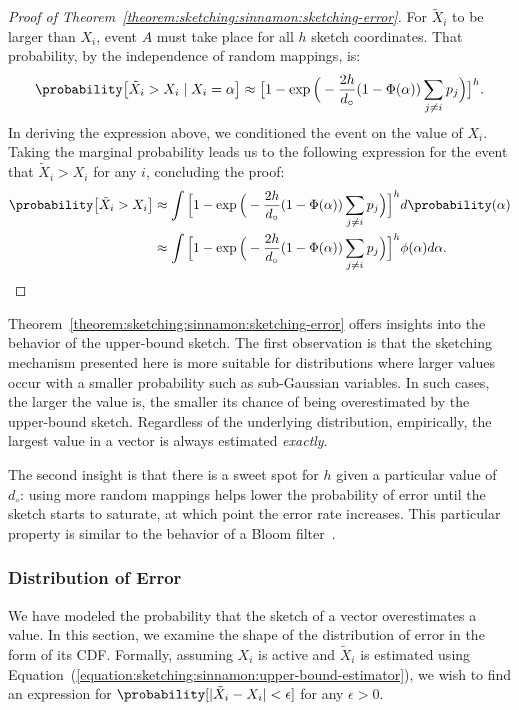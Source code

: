 \begin{proof}[Proof of Theorem~\ref{theorem:sketching:sinnamon:sketching-error}]
    For $\tilde{X}_i$ to be larger than $X_i$, event $A$ must take place for all $h$ sketch coordinates.
    That probability, by the independence of random mappings, is:
    \begin{equation*}
        \probability\big[ \tilde{X}_i > X_i \;|\; X_i = \alpha \big] \approx \big[ 1 - \exp\Big(-\frac{2h}{d_\circ} (1 - \Phi(\alpha)) \sum_{j \neq i} p_j \Big) \big]^h.
    \end{equation*}
    In deriving the expression above, we conditioned the event on the value of $X_i$.
    Taking the marginal probability leads us to the following expression for the event
    that $\tilde{X}_i > X_i$ for any $i$, concluding the proof:
    \begin{align*}
        \probability\big[ \tilde{X}_i > X_i \big] &\approx
            \int {\Big[ 1 - \exp\Big(-\frac{2h}{d_\circ} (1 - \Phi(\alpha)) \sum_{j \neq i} p_j \Big) \Big]^h d\probability(\alpha)} \\
            &\approx \int {\Big[ 1 - \exp\Big(-\frac{2h}{d_\circ} (1 - \Phi(\alpha)) \sum_{j \neq i} p_j\Big) \Big]^h \phi(\alpha) d\alpha}.
    \end{align*}
\end{proof}

\begin{svgraybox}
Theorem~\ref{theorem:sketching:sinnamon:sketching-error} offers insights into the
behavior of the upper-bound sketch. The first observation is that the sketching mechanism
presented here is more suitable for distributions where larger values occur with a smaller
probability such as sub-Gaussian variables. In such cases, the larger the value is,
the smaller its chance of being overestimated by the upper-bound sketch.
Regardless of the underlying distribution, empirically, the largest value in a
vector is always estimated \emph{exactly}.
\end{svgraybox}

The second insight is that there is a sweet spot for $h$ given a particular value
of $d_\circ$: using more random mappings helps lower the probability of error until
the sketch starts to saturate, at which point the error rate increases.
This particular property is similar to the behavior of a Bloom filter~\citep{bloom-filter}.

\subsubsection{Distribution of Error}
We have modeled the probability that the sketch of a vector overestimates a value.
In this section, we examine the shape of the distribution of error in the form of its
CDF. Formally, assuming $X_i$ is active and $\tilde{X}_i$ is estimated using
Equation~(\ref{equation:sketching:sinnamon:upper-bound-estimator}),
we wish to find an expression for
$\probability[\lvert \tilde{X}_i - X_i \rvert < \epsilon]$ for any $\epsilon > 0$.

